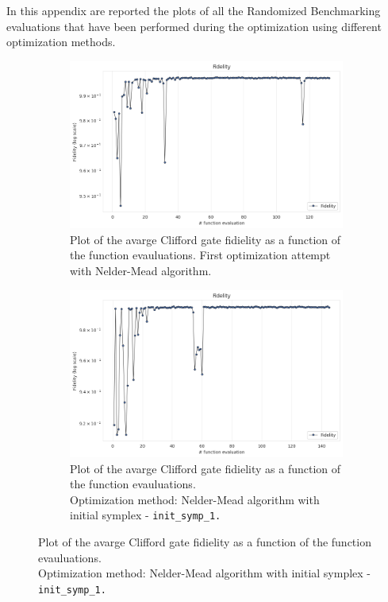 In this appendix are reported the plots of all the Randomized Benchmarking evaluations that have been performed during the optimization using different optimization methods.
\begin{figure}[h!]
    \centering
    \begin{subfigure}[t]{0.45\textwidth}
        \includegraphics[width=\textwidth]{figures/png/RB_optimization/NM/post_ft_true/NM_complete.png}
        \caption{Plot of the avarge Clifford gate fidielity as a function of the function evauluations. First optimization attempt with Nelder-Mead algorithm.}
        \label{NM_true_fig:complete}
    \end{subfigure}
    \hfill
    \begin{subfigure}[t]{0.45\textwidth}
        \includegraphics[width=\textwidth]{figures/png/RB_optimization/NM/InitialSymplex/20241110_211211/complete.png}
        \caption{Plot of the avarge Clifford gate fidielity as a function of the function evauluations.\\
                Optimization method: Nelder-Mead algorithm with initial symplex - \tt{init\_symp\_1}.}
        \label{NM_true_fig:}
    \end{subfigure}


\end{figure}
